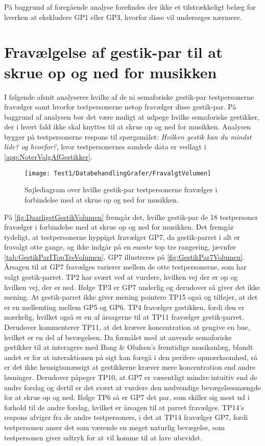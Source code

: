 På baggrund af foregående analyse forefindes der ikke et tilstrækkeligt belæg for hverken at ekskludere GP1 eller GP3, hvorfor disse vil undersøges nærmere. 
%
\section{Fravælgelse af gestik-par til at skrue op og ned for musikken}
\label{app:TestresultaterVolumenDaarlig}
%
I følgende afsnit analyseres hvilke af de ni semaforiske gestik-par testpersonerne fravælger samt hvorfor testpersonerne netop fravælger disse gestik-par. På baggrund af analysen bør det være muligt at udpege hvilke semaforiske gestikker, der i hvert fald ikke skal knyttes til at skrue op og ned for musikken. Analysen bygger på testpersonerne respons til spørgsmålet: \textit{Hvilken gestik kan du mindst lide? og hvorfor?}, hvor testpersonernes samlede data er vedlagt i \autoref{app:NoterValgAfGestikker}.
%
\begin{figure}[H]
	\centering
	\texttt{[image: Test1/DatabehandlingGrafer/FravalgtVolumen]}
	\caption{Søjlediagram over hvilke gestik-par testpersonerne fravælger i forbindelse med at skrue op og ned for musikken.}
	\label{fig:DaarligstGestikVolumen}
\end{figure}
\noindent
%
På \autoref{fig:DaarligstGestikVolumen} fremgår det, hvilke gestik-par de 18 testpersoner fravælger i forbindelse med at skrue op og ned for musikken. Det fremgår tydeligt, at testpersonerne hyppigst fravælger GP7, da gestik-parret i alt er fravalgt otte gange, og ikke indgår på en eneste top tre rangering, jævnfør \autoref{tab:GestikParITopTreVolumen}. GP7 illustreres på \autoref{fig:GestikPar7Volumen}. Årsagen til at GP7 fravælges varierer mellem de otte testpersonerne, som har valgt gestik-parret. TP2 har svært ved at vurdere, hvilken vej der er op og hvilken vej, der er ned. Ifølge TP3 er GP7 underlig og derudover så giver det ikke mening. At gestik-parret ikke giver mening pointere TP15 også og tilføjer, at det er en mellemting mellem GP5 og GP6. TP4 fravælger gestikken, fordi den er mærkelig, hvilket også er en af årsagerne til at TP11 fravælger gestik-parret. Derudover kommenterer TP11, at det kræver koncentration at gengive en bue, hvilket er en del af bevægelsen. Da formålet med at anvende semaforiske gestikker til at interagere med Bang $\&$ Olufsen's fremtidige musikanlæg, blandt andet er for at interaktionen på sigt kan foregå i den perifere opmærksomhed, så er det ikke hensigtsmæssigt at gestikkerne kræver mere koncentration end andre løsninger. Derudover påpeger TP10, at GP7 er væsentligt mindre intuitiv end de andre forslag og dertil er det svært at vurdere den nødvendige bevægelsesmængde for at skrue op og ned. Ifølge TP6 så er GP7 det par, som skiller sig mest ud i forhold til de andre forslag, hvilket er årsagen til at parret fravælges. TP14's respons afviger fra de andre testpersoners, i det at TP14 fravælger GP7, fordi testpersonen anser det som værende en meget naturlig bevægelse, som testpersonen giver udtryk for at vil komme til at lave ubevidst.
